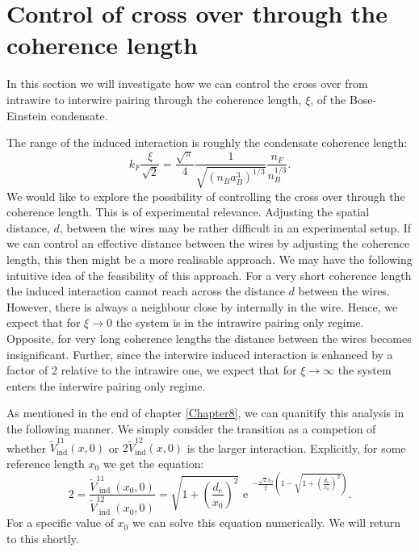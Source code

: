 \section{Control of cross over through the coherence length}
\label{sec.2wires_crossover_control_coherence_length}
In this section we will investigate how we can control the cross over from intrawire to interwire pairing through the coherence length, $\xi$, of the Bose-Einstein condensate.

The range of the induced interaction is roughly the condensate coherence length:
\begin{equation}
k_F\frac{\xi}{\sqrt{2}} = \frac{\sqrt{\pi}}{4}\frac{1}{\sqrt{(n_Ba_B^3)^{1/3}}}\frac{n_F}{n_B^{1/3}}.
\label{eq.RangefunctionofrBBnB}
\end{equation}
We would like to explore the possibility of controlling the cross over through the coherence length. This is of experimental relevance. Adjusting the spatial distance, $d$, between the wires may be rather difficult in an experimental setup. If we can control an effective distance between the wires by adjusting the coherence length, this then might be a more realisable approach. We may have the following intuitive idea of the feasibility of this approach. For a very short coherence length the induced interaction cannot reach across the distance $d$ between the wires. However, there is always a neighbour close by internally in the wire. Hence, we expect that for $\xi \to 0$ the system is in the intrawire pairing only regime. Opposite, for very long coherence lengths the distance between the wires becomes insignificant. Further, since the interwire induced interaction is enhanced by a factor of 2 relative to the intrawire one, we expect that for $\xi \to \infty$ the system enters the interwire pairing only regime. 

As mentioned in the end of chapter \ref{Chapter8}, we can quanitify this analysis in the following manner. We simply consider the transition as a competion of whether $\tilde{V}^{11}_{\text{ind}}(x,0)$ or $2\tilde{V}^{12}_{\text{ind}}(x,0)$ is the larger interaction. Explicitly, for some reference length $x_0$ we get the equation:
\begin{equation}
2 = \frac{ \tilde{V}^{11}_{\text{ ind }}(x_0, 0) }{ \tilde{V}^{12}_{\text{ ind }}(x_0, 0) } = \sqrt{ 1 + \left( \frac{ d_c }{ x_0 } \right)^2 }\text{ e }^{ -\frac{ \sqrt{2}x_0 }{ \xi } \left( 1 - \sqrt{ 1 + \left( \frac{ d_c }{ x_0 } \right)^2 } \right) }.
\label{eq.2wires.Vequal}
\end{equation}
For a specific value of $x_0$ we can solve this equation numerically. We will return to this shortly.  

